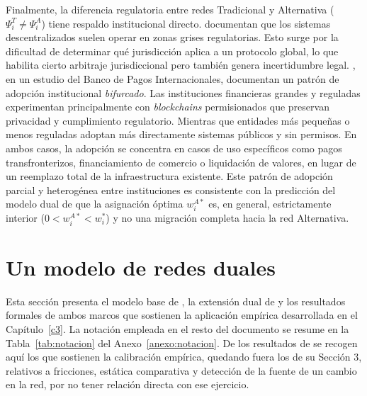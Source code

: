 Finalmente, la diferencia regulatoria entre redes Tradicional y Alternativa
($\Psi_i^T \neq \Psi_i^A$) tiene respaldo institucional directo.
 documentan que los sistemas
descentralizados suelen operar en zonas grises regulatorias. Esto surge por la dificultad
de determinar qué jurisdicción aplica a un protocolo global, lo que habilita cierto arbitraje jurisdiccional pero también genera incertidumbre legal. 
, en un estudio del Banco de Pagos Internacionales, documentan un patrón de adopción institucional \textit{bifurcado}. 
Las instituciones financieras grandes y reguladas experimentan principalmente con
\textit{blockchains} permisionados que preservan privacidad y cumplimiento
regulatorio. 
Mientras que entidades más pequeñas o menos reguladas adoptan más directamente sistemas públicos y sin permisos. 
En ambos casos, la adopción se concentra en casos de uso específicos como pagos transfronterizos, financiamiento de comercio o liquidación de valores, en lugar de un reemplazo total de la infraestructura existente. 
Este patrón de adopción parcial y heterogénea entre instituciones es consistente con la predicción del modelo dual de que la
asignación óptima $w_i^{A*}$ es, en general, estrictamente interior
($0 < w_i^{A*} < w_i^*$) y no una migración completa hacia la red Alternativa.

\section{Un modelo de redes duales}
\label{c24}

Esta sección presenta el modelo base de , la extensión dual de  y los resultados formales de ambos marcos que sostienen la aplicación empírica desarrollada en el Capítulo~\ref{c3}. La notación empleada en el resto del documento se resume en la Tabla~\ref{tab:notacion} del Anexo~\ref{anexo:notacion}. De los resultados de  se recogen aquí los que sostienen la calibración empírica, quedando fuera los de su Sección 3, relativos a fricciones, estática comparativa y detección de la fuente de un cambio en la red, por no tener relación directa con ese ejercicio.

